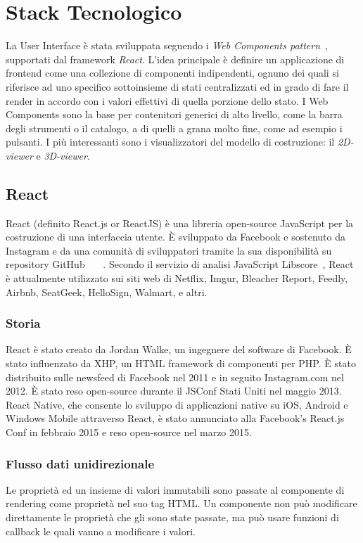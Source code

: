 \section{Stack Tecnologico}
\label{sec:chapter_2_section_3}

La User Interface è stata sviluppata seguendo i \emph{Web Components pattern}~\cite{web_components},
supportati dal framework \emph{React}.
L'idea principale è definire un applicazione di frontend come una collezione di componenti indipendenti,
ognuno dei quali si riferisce ad uno specifico sottoinsieme di stati centralizzati ed in grado
di fare il render in accordo con i valori effettivi di quella porzione dello stato.
I Web Components sono la base per contenitori generici di alto livello, come la barra degli strumenti o il catalogo,
a di quelli a grana molto fine, come ad esempio i pulsanti. I più interessanti sono i visualizzatori del
modello di costruzione: il \emph{2D-viewer} e \emph{3D-viewer}.

\subsection{React}
\label{sec:chapter_2_section_3_sub_1}
React (definito React.js or ReactJS) è una libreria open-source JavaScript per la costruzione di una interfaccia utente.
\`E sviluppato da Facebook e sostenuto da Instagram e da una comunità di sviluppatori tramite la sua disponibilità su repository GitHub
~\cite{infoworld}~\cite{facebookreact}~\cite{reactjs}. Secondo il servizio di analisi JavaScript Libscore~\cite{libscope},
React è attualmente utilizzato sui  siti web di Netflix, Imgur, Bleacher Report, Feedly, Airbnb, SeatGeek,
HelloSign, Walmart, e altri.

\subsubsection{Storia}
React è stato creato da Jordan Walke, un ingegnere del software di Facebook. \`E stato influenzato da XHP, un HTML
framework di componenti per PHP. \`E stato distribuito sulle newsfeed di Facebook nel 2011 e in seguito
Instagram.com nel 2012. \`E stato reso open-source durante il JSConf Stati Uniti nel maggio 2013.
React Native, che consente lo sviluppo di applicazioni native su iOS, Android e Windows Mobile attraverso React,
è stato annunciato alla Facebook's React.js Conf in febbraio 2015 e reso open-source nel marzo 2015.

\subsubsection{Flusso dati unidirezionale}
Le propriet\`a ed un insieme di valori immutabili sono passate al componente di rendering come propriet\`a nel suo tag HTML.
Un componente non pu\`o modificare direttamente le propriet\`a che gli sono state passate, ma pu\`o usare funzioni di
callback le quali vanno a modificare i valori.

